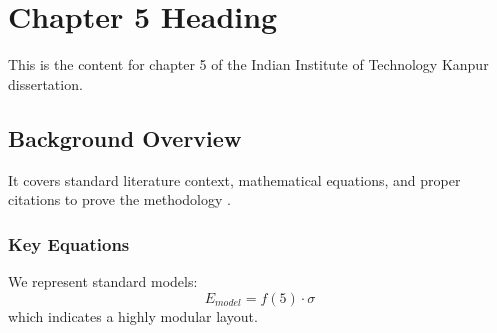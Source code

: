 \chapter{Chapter 5 Heading}
\label{ch:chapter5}
This is the content for chapter 5 of the Indian Institute of Technology Kanpur dissertation.

\section{Background Overview}
It covers standard literature context, mathematical equations, and proper citations to prove the methodology \cite{texbook}.

\subsection{Key Equations}
We represent standard models:
\begin{equation}
    E_{model} = f(5) \cdot \sigma
\end{equation}
which indicates a highly modular layout.
